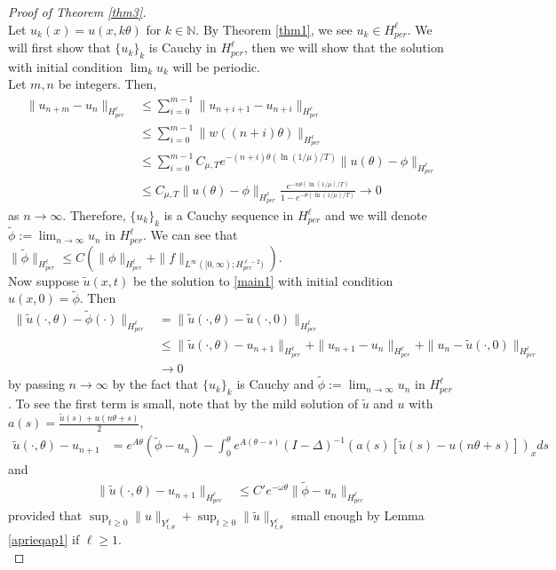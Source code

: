 \documentclass[10pt,a4paper,final]{article}
\numberwithin{equation}{section}
\newcommand{\N}{\mathbb{N}}
\newcommand{\Gth}{\theta}
\begin{document}
\begin{proof}[Proof of Theorem \ref{thm3}]\ \\
Let $u_k(x)=u(x,k\theta)$ for $k\in \N$. By Theorem \ref{thm1}, we see $u_k\in H^{\ell}_{per}$. We will first show that $\{u_k\}_k$ is Cauchy in $H^{\ell}_{per}$, then we will show that the solution with initial condition $\lim_k u_k$ will be periodic.\\

    Let $m,n$ be integers. Then,
    \begin{align*}
        \|u_{n+m}-u_n\|_{H^{\ell}_{per}}&\leq \sum_{i=0}^{m-1}\|u_{n+i+1}-u_{n+i}\|_{H^{\ell}_{per}}\\
        &\leq \sum_{i=0}^{m-1}\|w((n+i)\theta)\|_{H^{\ell}_{per}}\\
        &\leq \sum_{i=0}^{m-1}C_{\mu,T}e^{-(n+i)\theta(\ln(1/\mu)/T)}\|u(\theta)-\phi\|_{H^{\ell}_{per}}\\
        &\leq C_{\mu,T}\|u(\theta)-\phi\|_{H^{\ell}_{per}}\frac{e^{-n\theta(\ln(1/\mu)/T)}}{1-e^{-\theta(\ln(1/\mu)/T)}}\to 0
    \end{align*}
    as $n\to\infty$. Therefore, $\{ u_{k}\}_k$ is a Cauchy sequence in $H^{\ell}_{per}$ and we will denote $\widetilde{\phi}:=\lim_{n\to\infty}u_n$ in $H^{\ell}_{per}$. We can see that $\|\widetilde{\phi}\|_{H^{\ell}_{per}}\leq C(\|\phi\|_{H^{\ell}_{per}}+\|f\|_{L^\infty([0,\infty);H^{\ell-2}_{per})}).$\\

    Now suppose $\widetilde{u}(x,t)$ be the solution to \eqref{main1} with initial condition $u(x,0)=\widetilde{\phi}$. Then
    \begin{align*}
    \|\widetilde{u}(\cdot,\theta)-\widetilde{\phi}(\cdot)\|_{H^{\ell}_{per}} &=\|\widetilde{u}(\cdot,\theta)-\widetilde{u}(\cdot,0)\|_{H^{\ell}_{per}}\\
        &\leq \|\widetilde{u}(\cdot,\theta)-u_{n+1}\|_{H^{\ell}_{per}}+\|u_{n+1}-u_n\|_{H^{\ell}_{per}}+\|u_n-\widetilde{u}(\cdot,0)\|_{H^{\ell}_{per}}\\
        &\to 0
    \end{align*}
    by passing $n\to \infty$ by the fact that $\{u_k\}_k$ is Cauchy and $\widetilde{\phi}:=\lim_{n\to\infty}u_n$ in $H^{\ell}_{per}$. To see the first term is small, note that by the mild solution of $\widetilde{u}$ and $u$ with $a(s)=\frac{\widetilde{u}(s)+u(n\theta+s)}{2}$, 
    \begin{align*}
        \widetilde{u}(\cdot,\theta)-u_{n+1}&= e^{A\theta}(\widetilde{\phi}-u_n)-\int_{0}^{\theta}e^{A(\theta-s)}(I-\Delta)^{-1}(a(s)[\widetilde{u}(s)-u(n\theta+s)])_xds
    \end{align*}
    and 
    \begin{align*}
        \|\widetilde{u}(\cdot,\theta)-u_{n+1}\|_{H^{\ell}_{per}}&\leq  C'e^{-\omega \theta}\|\widetilde{\phi}-u_n\|_{H^{\ell}_{per}}
    \end{align*}
    provided that $\sup_{t\geq 0}\|u\|_{Y^{\ell}_{t,\Gth}}+\sup_{t\geq 0}\|\widetilde{u}\|_{Y^{\ell}_{t,\Gth}}$ small enough by Lemma \ref{aprieqap1} if $\ell\geq 1$. \\


\end{proof}
\end{document}

